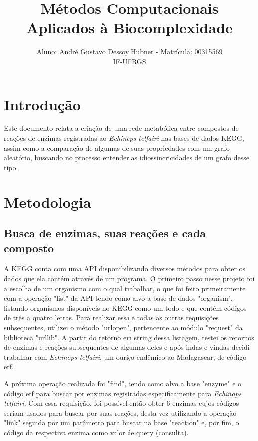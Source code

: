 \documentclass[brazilian,12pt,a4paper,final]{article}
\title{Métodos Computacionais Aplicados à Biocomplexidade}
\author{Aluno: André Gustavo Dessoy Hubner - Matrícula: 00315569 \\ IF-UFRGS}
\begin{document}
	\maketitle
	
	\section{Introdu\c{c}\~ao} 
	\indent 
	Este documento relata a criação de uma rede metabólica entre compostos de reações de enzimas registradas ao \textit{Echinops telfairi} nas bases de dados KEGG, assim como a comparação de algumas de suas propriedades com um grafo aleatório, buscando no processo entender as idiossincricidades de um grafo desse tipo.
	
	\section{Metodologia}
	\subsection{Busca de enzimas, suas reações e cada composto}
	A KEGG conta com uma API disponibilizando diversos métodos para obter os dados que ela contém através de um programa. O primeiro passo nesse projeto foi a escolha de um organismo com o qual trabalhar, o que foi feito primeiramente com a operação "list" da API tendo como alvo a base de dados "organism", listando organismos disponíveis no KEGG como um todo e que contêm códigos de três a quatro letras. Para realizar essa e todas as outras requisições subsequentes, utilizei o método "urlopen", pertencente ao módulo "request" da biblioteca "urllib". A partir do retorno em string dessa listagem, testei os retornos de enzimas e reações subsequentes de algumas deles e após indas e vindas decidi trabalhar com 	
	\textit{Echinops telfairi}, um ouriço endêmico ao Madagascar, de côdigo etf.
	\vspace{0.5cm}
	
	A próxima operação realizada foi "find", tendo como alvo a base "enzyme" e o código etf para buscar por enzimas registradas especificamente para \textit{Echinops telfairi}. Com essa requisição, foi possível então obter 6 enzimas cujos códigos seriam usados para buscar por suas reações, desta vez utilizando a operação "link" seguida por um parâmetro para buscar na base "reaction" e, por fim, o código da respectiva enzima como valor de query (consulta). 
	\vspace{0.5cm}
	
\end{document}
